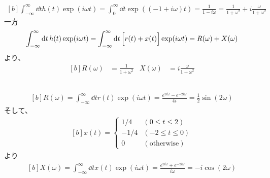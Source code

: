 \documentclass[../ap_2015.tex]{subfiles}
\begin{document}
\subsection{}
\begin{equation}\begin{aligned}[b]
    \int_{-\infty}^{\infty}\dd{t}h(t)\exp(i\omega t) = \int_{0}^{\infty}\dd{t}\exp((-1+i\omega)t)
    = \frac{1}{1-i\omega}
    = \frac{1}{1+\omega^2}+i\frac{\omega}{1+\omega^2}
\end{aligned}\end{equation}
一方
\begin{equation}\begin{aligned}[b]
    \int_{-\infty}^{\infty}\dd{t}h(t)\exp(i\omega t) = \int_{-\infty}^{\infty}\dd{t}\Bigl[r(t)+x(t)\Bigr]\exp(i\omega t)
    = R(\omega)+X(\omega)
\end{aligned}\end{equation}
より、
\begin{equation}\begin{aligned}[b]
    R(\omega) &= \frac{1}{1+\omega^2} & X(\omega) &= i\frac{\omega}{1+\omega^2}
\end{aligned}\end{equation}

\subsection{}
\begin{equation}\begin{aligned}[b]
    R(\omega)=\int_{-\infty}^{\infty}\dd{t} r(t)\exp(i\omega t)
    = \frac{e^{2i\omega}-e^{-2i\omega}}{4i}=\frac{1}{2}\sin(2\omega)
\end{aligned}\end{equation}
そして、
\begin{equation}\begin{aligned}[b]
    x(t) = \begin{cases}
        1/4 & (0 \leq  t \leq 2)\\
        -1/4 & (-2 \leq  t \leq 0)\\
        0 & (\text{otherwise})
    \end{cases}
\end{aligned}\end{equation}
より
\begin{equation}\begin{aligned}[b]
    X(\omega) = \int_{-\infty}^{\infty}\dd{t}x(t)\exp(i\omega t) = \frac{e^{2i\omega}+e^{-2i\omega}}{i\omega} = -i\cos(2\omega)
\end{aligned}\end{equation}
\end{document}
